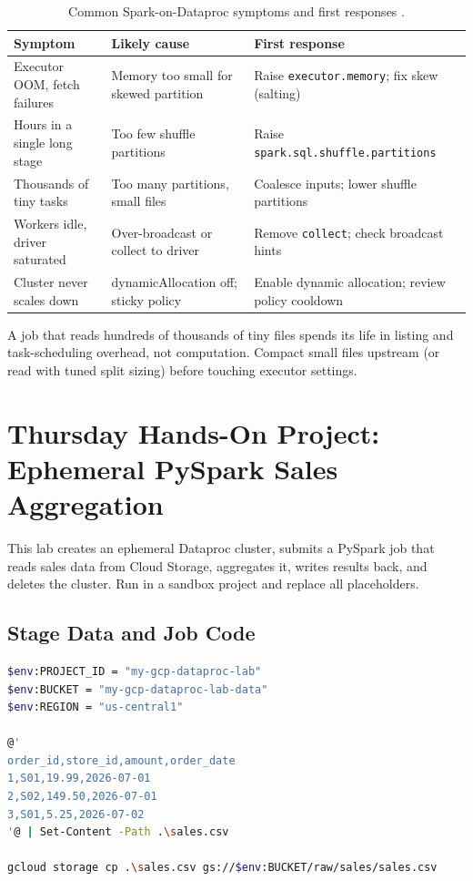 \begin{table}[H]
\centering
\small
\begin{tabular}{@{}p{4.6cm}p{4.2cm}p{4.6cm}@{}} \\
\toprule
\textbf{Symptom} & \textbf{Likely cause} & \textbf{First response} \\
\midrule
Executor OOM, fetch failures & Memory too small for skewed partition & Raise \texttt{executor.memory}; fix skew (salting) \\
Hours in a single long stage & Too few shuffle partitions & Raise \texttt{spark.sql.shuffle.partitions} \\
Thousands of tiny tasks & Too many partitions, small files & Coalesce inputs; lower shuffle partitions \\
Workers idle, driver saturated & Over-broadcast or collect to driver & Remove \texttt{collect}; check broadcast hints \\
Cluster never scales down & dynamicAllocation off; sticky policy & Enable dynamic allocation; review policy cooldown \\
\bottomrule
\end{tabular}
\caption{Common Spark-on-Dataproc symptoms and first responses \cite{apachesparkdocs}.}
\label{tab:ch9-spark-symptoms}
\end{table}

\begin{pitfall}
A job that reads hundreds of thousands of tiny files spends its life in listing and task-scheduling overhead, not computation. Compact small files upstream (or read with tuned split sizing) before touching executor settings.
\end{pitfall}

\section{Thursday Hands-On Project: Ephemeral PySpark Sales Aggregation}
This lab creates an ephemeral Dataproc cluster, submits a PySpark job that reads sales data from Cloud Storage, aggregates it, writes results back, and deletes the cluster. Run in a sandbox project and replace all placeholders.

\subsection{Stage Data and Job Code}
\begin{lstlisting}[language=bash,caption={Staging sample sales data and the PySpark job.}]
$env:PROJECT_ID = "my-gcp-dataproc-lab"
$env:BUCKET = "my-gcp-dataproc-lab-data"
$env:REGION = "us-central1"

@'
order_id,store_id,amount,order_date
1,S01,19.99,2026-07-01
2,S02,149.50,2026-07-01
3,S01,5.25,2026-07-02
'@ | Set-Content -Path .\sales.csv

gcloud storage cp .\sales.csv gs://$env:BUCKET/raw/sales/sales.csv
\end{lstlisting}

